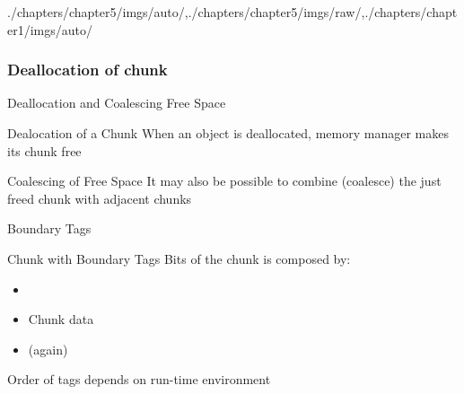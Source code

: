 \begin{graphicspathcontext}{{./chapters/chapter5/imgs/auto/},{./chapters/chapter5/imgs/raw/},{./chapters/chapter1/imgs/auto/}}
\begin{bibunit}[apalike]
\subsubsection{Deallocation of chunk}
\subsubsectiontableofcontentslide

\begin{frame}{Deallocation and Coalescing Free Space}
	\begin{block}{Dealocation of a Chunk}
		When an object is deallocated, memory manager makes its chunk free
	\end{block}
	\vspace{.5cm}
	\begin{definitionblock}{Coalescing of Free Space}
		It may also be possible to combine (coalesce) the just freed chunk with adjacent chunks
	\end{definitionblock}
	\vspace{.5cm}
	\begin{center}
		\hspace{1cm}
	\end{center}
\end{frame}

\begin{frame}{Boundary Tags}
	\begin{definitionblock}{Chunk with Boundary Tags}
		Bits of the chunk is composed by:
		\begin{itemize}
			\item {}
			\item Chunk data
			\item {} (again)
		\end{itemize}
		Order of tags depends on run-time environment
	\end{definitionblock}
	\vspace{.25cm}
	\begin{center}
	\end{center}
\end{frame}


\end{bibunit}
\end{graphicspathcontext}
